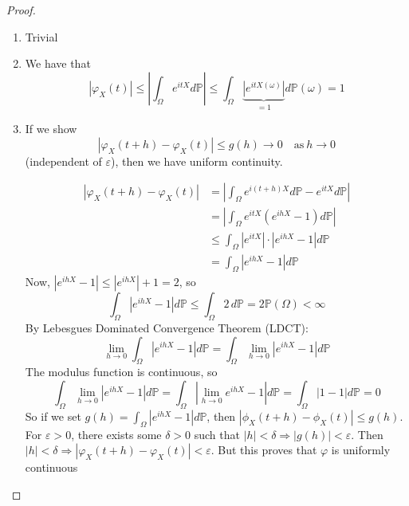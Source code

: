 \documentclass[11pt,a4paper]{article}
\theoremstyle{definition}
\begin{document}
\begin{proof} $ $
\begin{enumerate}
\item Trivial
\item We have that \[
|\varphi _X(t)| \le \left | \int _\Omega e^{itX} d \mathbb{P}\right | \le \int _{\Omega} \underbrace{|e^{itX(\omega)}|}_{=1} d\mathbb{P}(\omega) = 1
\]
\item If we show 
\[
|\varphi_X(t+h) - \varphi_X(t)| \leq g(h) \to 0 \quad \text{as}\ h \to 0
\]
(independent of $\varepsilon$), then we have uniform continuity.

\begin{align*}
|\varphi_X(t+h) - \varphi_X(t)| & = \left| \int_{\Omega} e^{i(t+h)X} d\mathbb{P} - e^{itX} d\mathbb{P} \right| \\
& = \left| \int_{\Omega} e^{itX}\left(e^{ihX} - 1\right) d\mathbb{P} \right| \\
& \leq \int_{\Omega} |e^{itX}| \cdot |e^{ihX} - 1| d\mathbb{P} \\ & = \int_{\Omega} |e^{ihX} - 1| d\mathbb{P}
\end{align*}
Now, $|e^{ihX} - 1| \leq |e^{ihX}| + 1 = 2$, so
\[
\int_{\Omega} |e^{ihX} - 1| d\mathbb{P} \leq \int_{\Omega} 2\, d\mathbb{P} = 2 \mathbb{P}(\Omega) < \infty
\]
By Lebesgues Dominated Convergence Theorem (LDCT):
\[
\lim_{h \to 0} \int_{\Omega} |e^{ihX} - 1| d\mathbb{P} = \int_{\Omega} \lim_{h \to 0} |e^{ihX} - 1| d \mathbb{P}
\]
The modulus function is continuous, so
\[
\int_{\Omega} \lim_{h\to 0} |e^{ihX} - 1| d\mathbb{P} = \int_{\Omega} \left |\lim_{h \to 0} e^{ihX} - 1 \right | d\mathbb{P} = \int_{\Omega} |1 - 1| d\mathbb{P} = 0
\]
So if we set $g(h) = \int_{\Omega} |e^{ihX} - 1| d\mathbb{P}$, then $|\phi _X(t+h) - \phi _X(t)| \le g(h)$. For $\varepsilon > 0$, there exists some $\delta > 0$ such that $|h| < \delta \Longrightarrow |g(h)| < \varepsilon$. Then $|h| < \delta \Longrightarrow |\varphi _X(t + h) - \varphi_X(t)| < \varepsilon$. But this proves that $\varphi$ is uniformly continuous


\end{enumerate}
\end{proof}
\end{document}
